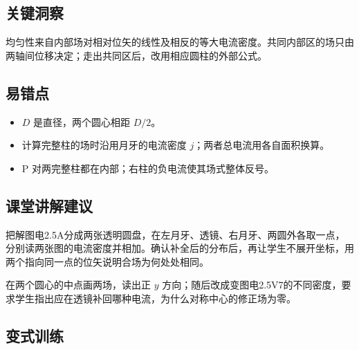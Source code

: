 \documentclass[UTF8,fontset=fandol,a4paper,11pt]{ctexart}
\begin{document}


\subsection*{关键洞察}

均匀性来自内部场对相对位矢的线性及相反的等大电流密度。共同内部区的场只由两轴间位移决定；走出共同区后，改用相应圆柱的外部公式。



\subsection*{易错点}

\begin{itemize}
\item $D$ 是直径，两个圆心相距 $D/2$。
\item 计算完整柱的场时沿用月牙的电流密度 $j$；两者总电流用各自面积换算。
\item P 对两完整柱都在内部；右柱的负电流使其场式整体反号。
\end{itemize}



\subsection*{课堂讲解建议}

把解图电2.5A分成两张透明圆盘，在左月牙、透镜、右月牙、两圆外各取一点，分别读两张图的电流密度并相加。确认补全后的分布后，再让学生不展开坐标，用两个指向同一点的位矢说明合场为何处处相同。

在两个圆心的中点画两场，读出正 $y$ 方向；随后改成变图电2.5V7的不同密度，要求学生指出应在透镜补回哪种电流，为什么对称中心的修正场为零。


\subsection*{变式训练}
\end{document}
